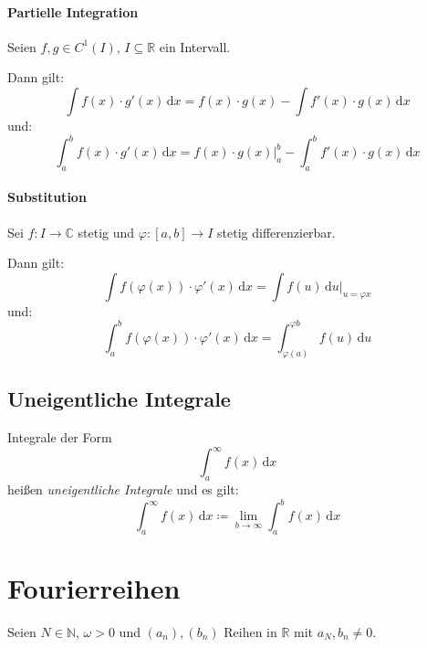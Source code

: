 			\paragraph{Partielle Integration}
				Seien $ f, g \in C ^ 1 (I) $, $ I \subseteq \mathbb{R} $ ein Intervall.

				Dann gilt:
				\begin{equation*}
					\int \! f(x) \cdot g'(x) \, \mathrm{d}x = f(x) \cdot g(x) - \int \! f'(x) \cdot g(x) \, \mathrm{d}x
				\end{equation*}
				und:
				\begin{equation*}
					\int _ a ^ b \! f(x) \cdot g'(x) \, \mathrm{d}x = f(x) \cdot g(x) \Bigr| _ a ^ b - \int _ a ^ b \! f'(x) \cdot g(x) \, \mathrm{d}x
				\end{equation*}

			\paragraph{Substitution}
				Sei $ f : I \rightarrow \mathbb{C} $ stetig und $ \varphi : [a, b] \rightarrow I $ stetig differenzierbar.

				Dann gilt:
				\begin{equation*}
					\int \! f(\varphi(x)) \cdot \varphi'(x) \, \mathrm{d}x = \int \! f(u) \, \mathrm{d}u \Bigr| _ { u = \varphi{x} }
				\end{equation*}
				und:
				\begin{equation*}
					\int _ a ^ b \! f(\varphi(x)) \cdot \varphi'(x) \, \mathrm{d}x = \int _ { \varphi(a) } ^ { \varphi{b} } \! f(u) \, \mathrm{d}u
				\end{equation*}

		\subsection{Uneigentliche Integrale}
			Integrale der Form \[ \int _ a ^ \infty \! f(x) \, \mathrm{d}x \] heißen \textit{uneigentliche Integrale} und es gilt:
			\begin{equation*}
				\int _ a ^ \infty \! f(x) \, \mathrm{d}x \coloneqq \lim _ { b \rightarrow \infty } \int _ a ^ b \! f(x) \, \mathrm{d}x
			\end{equation*}

	\section{Fourierreihen}
		Seien $ N \in \mathbb{N} $, $ \omega > 0 $ und $ (a _ n), (b _ n) $ Reihen in $ \mathbb{R} $ mit $ a _ N, b _ n \neq 0 $.

